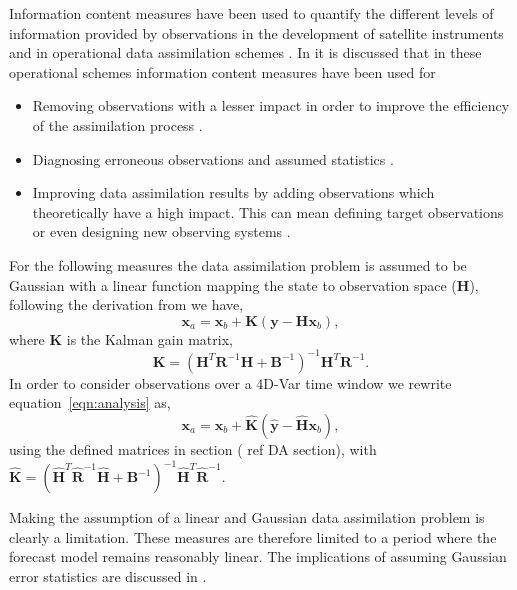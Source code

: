 \documentclass[11pt]{article}
\begin{document}
Information content measures have been used to quantify the different levels of information provided by observations in the development of satellite instruments \citep{stewart2008correlated, engelen2004information} and in operational data assimilation schemes \citep{fisher2003estimation, singh2013practical}. In \citet{Fowler2013} it is discussed that in these operational schemes information content measures have been used for
\begin{itemize}
\item Removing observations with a lesser impact in order to improve the efficiency of the assimilation process \citep{rabier2002channel, singh2013practical, rodgers1998information}.
\item Diagnosing erroneous observations and assumed statistics \citep{desroziers2009posteriori}.
\item Improving data assimilation results by adding observations which theoretically have a high impact. This can mean defining target observations \citep{palmer1998singular} or even designing new observing systems \citep{wahba1985design, eyre1990information}. 
\end{itemize}

For the following measures the data assimilation problem is assumed to be Gaussian with a linear function mapping the state to  observation space (\textbf{H}), following the derivation from \citet{kalnay2003atmospheric} we have,
\begin{equation}
\textbf{x}_{a} = \textbf{x}_{b} + \textbf{K}(\textbf{y} - \textbf{H}\textbf{x}_{b}), \label{eqn:analysis}
\end{equation}
where $\textbf{K}$ is the Kalman gain matrix,
\begin{equation}
\textbf{K} = (\textbf{H}^{T}\textbf{R}^{-1}\textbf{H} + \textbf{B}^{-1})^{-1}\textbf{H}^{T}\textbf{R}^{-1}.
\end{equation}
In order to consider observations over a 4D-Var time window we rewrite equation~\eqref{eqn:analysis} as,
\begin{equation}
\textbf{x}_{a} = \textbf{x}_{b} + \hat{\textbf{K}}(\hat{\textbf{y}} - \hat{\textbf{H}}\textbf{x}_{b}),
\end{equation}
using the defined matrices in section ({\color{red} ref DA section}), with $\hat{\textbf{K}} = (\hat{\textbf{H}}^{T}\hat{\textbf{R}}^{-1}\hat{\textbf{H}} + \textbf{B}^{-1})^{-1}\hat{\textbf{H}}^{T}\hat{\textbf{R}}^{-1}.$ 

Making the assumption of a linear and Gaussian data assimilation problem is clearly a limitation. These measures are therefore limited to a period where the forecast model remains reasonably linear. The implications of assuming Gaussian error statistics are discussed in \citet{Fowler2013}.
\end{document}
